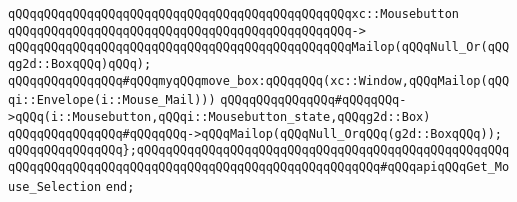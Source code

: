 \verb|qQQqqQQqqQQqqQQqqQQqqQQqqQQqqQQqqQQqqQQqqQQqqQQqxc::Mousebutton|\newline
\verb|qQQqqQQqqQQqqQQqqQQqqQQqqQQqqQQqqQQqqQQqqQQqqQQq->|\newline
\verb|qQQqqQQqqQQqqQQqqQQqqQQqqQQqqQQqqQQqqQQqqQQqqQQqMailop(qQQqNull_Or(qQQqg2d::BoxqQQq)qQQq);|\newline
\newline
\verb|qQQqqQQqqQQqqQQq#qQQqmyqQQqmove_box:qQQqqQQq(xc::Window,qQQqMailop(qQQqi::Envelope(i::Mouse_Mail)))|\newline
\verb|qQQqqQQqqQQqqQQq#qQQqqQQq->qQQq(i::Mousebutton,qQQqi::Mousebutton_state,qQQqg2d::Box)|\newline
\verb|qQQqqQQqqQQqqQQq#qQQqqQQq->qQQqMailop(qQQqNull_OrqQQq(g2d::BoxqQQq));|\newline
\newline
\verb|qQQqqQQqqQQqqQQq};qQQqqQQqqQQqqQQqqQQqqQQqqQQqqQQqqQQqqQQqqQQqqQQqqQQqqQQqqQQqqQQqqQQqqQQqqQQqqQQqqQQqqQQqqQQqqQQqqQQqqQQq#qQQqapiqQQqGet_Mouse_Selection|\newline
\newline
\verb|end;|\newline


